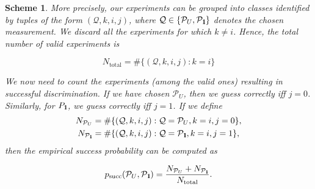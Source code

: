 \documentclass[preprint,12pt, a4paper]{elsarticle}
\newcommand{\ket}[1]{\ensuremath{|#1\rangle}}
\newcommand{\bra}[1]{\ensuremath{\langle#1|}}
\newcommand{\ketbra}[2]{\ensuremath{\ket{#1}\bra{#2}}}
\newcommand{\proj}[1]{\ensuremath{\ketbra{#1}{#1}}}
\newcommand{\1}{{\rm 1\hspace{-0.9mm}l}}
\newcommand{\Id}{{\rm 1\hspace{-0.9mm}l}}
\newcommand{\PP}{\mathcal{P}}
\newcommand{\QQ}{\mathcal{Q}}
\newtheorem{scheme}{Scheme}
\begin{document}
\begin{scheme}

More precisely, our experiments can be grouped into classes identified by tuples of the form
$(\mathcal{Q}, k, i, j)$, where $\mathcal{Q} \in \{\PP_U, \PP_\Id\}$ denotes the chosen measurement.
We discard all the experiments for which $k \ne i$. Hence, the total number of valid experiments is

\begin{equation}
	N_\text{total} = \#\{(\QQ, k, i, j): k = i \}
\end{equation}

We now need to count the experiments (among the valid ones) resulting in successful discrimination.
If we have chosen $\PP_U$, then we guess correctly iff $j=0$. Similarly, for
$P_\Id$, we guess correctly iff $j=1$. If we define
\begin{eqnarray}
	N_{\PP_U} &= \#\{(\mathcal{Q}, k, i, j): \mathcal{Q} = \PP_U, k = i, j = 0\}, \\
	N_{\PP_\Id} &= \#\{(\mathcal{Q}, k, i, j): \mathcal{Q} = \PP_\Id, k = i, j = 1\},
\end{eqnarray}
then the empirical success probability can be computed as

\begin{equation}
p_{\text{succ}}(\PP_{U}, \PP_{\Id}) = \frac{N_{\PP_U} + N_{\PP_\Id}}{N_{\text{total}}}.
\end{equation}

\end{scheme}
\end{document}
